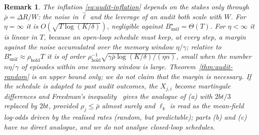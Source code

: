 \documentclass[11pt,a4paper]{article}
\newtheorem{remark}[theorem]{Remark}
\begin{document}
\begin{remark}\label{rem:audit-random}
The inflation \eqref{eq:audit-inflation} depends on the stakes only through
$\bar\rho=\Delta R/W$: the noise in $\hat\ell$ and the leverage of an audit both
scale with $W$. For $\eta=\infty$ it is $O(\sqrt{T\log(K/\delta)})$, negligible
against $B^\star_{\mathrm{unif}}=\Theta(T)$. For $\eta<\infty$ it is linear in
$T$, because an open-loop schedule must keep, at every step, a margin against
the noise accumulated over the memory window $\eta/\gamma$; relative to
$B^\star_{\mathrm{unif}}\approx\rho_{\mathrm{hold}}T$ it is of order
$\rho_{\mathrm{hold}}^{-1}\sqrt{\gamma\bar\rho\log(K/\delta)/(\eta n)}$, small
when the number $n\eta/\gamma$ of episodes within one memory window is large.
Theorem~\ref{thm:audit-random} is an upper bound only; we do not claim that the
margin is necessary. If the schedule is adapted to past audit outcomes, the
$X_{j,i}$ become martingale differences and Freedman's
inequality~\cite{freedman1975tail} gives the analogue of (a) with $2bt/3$ replaced by $2bt$, provided $\rho_j\le\bar\rho$ almost surely and $\ell_k$ is read as the mean-field log-odds driven by the realised rates (random, but predictable); parts (b) and (c) have no direct analogue, and we do not analyse closed-loop schedules.
\end{remark}
\end{document}
